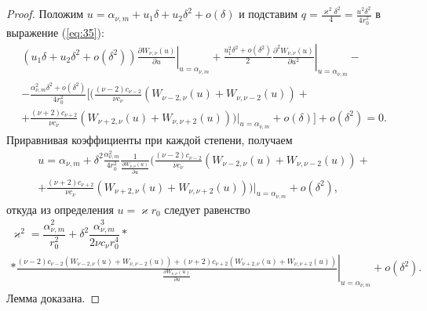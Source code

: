 \begin{proof}
Положим $u = \alpha_{\nu, m} + u_1 \delta + u_2 \delta^2 + o(\delta)$ и подставим $q = \frac{\varkappa^2 \delta^2}{4} = \frac{u^2 \delta^2}{4 r_0^2}$ в выражение (\ref{eq:35}):
\begin{multline*}
    (u_1 \delta + u_2 \delta^2 + o(\delta^2)) 
\left.
\frac{\partial W_{\nu, \nu}(u)}{\partial u}
\right|_{u=\alpha_{\nu, m}} + 
\left.
\frac{u_1^2\delta^2 + o(\delta^2)}{2}
\frac{\partial^2 W_{\nu, \nu}(u)}{\partial u^2}
\right|_{u=\alpha_{\nu, m}} - \\
-	\frac{\alpha_{\nu, m}^2 \delta^2 + o(\delta^2)}{4r_0^2}
\bigg[
\bigg(  \frac{(\nu-2) c_{\nu-2}}{\nu c_\nu} 
	\left(
	W_{\nu-2, \nu}(u) + W_{\nu, \nu-2}(u)
	\right)+ \\
	    + \frac{(\nu+2) c_{\nu+2}}{\nu c_\nu} 
	\left(
	W_{\nu+2, \nu}(u) + W_{\nu, \nu+2}(u)
	\right)
\left.
\bigg)
\right|_{u=\alpha_{\nu, m}}
+o(\delta)
\bigg]
 + o(\delta^2) = 0.
\end{multline*}
Приравнивая коэффициенты при каждой степени, получаем  
\begin{multline*}
    u = \alpha_{\nu, m} + \delta^2 \frac{\alpha_{\nu, m}^2}{4r_0^2} \frac{1}{\frac{\partial W_{\nu,\nu}(u)}{\partial u}}
\bigg(    
	\frac{(\nu-2) c_{\nu-2}}{\nu c_\nu} 
	\left(
	W_{\nu-2, \nu}(u) + W_{\nu, \nu-2}(u)
	\right)+ \\
	    + \frac{(\nu+2) c_{\nu+2}}{\nu c_\nu} 
	\left(
	W_{\nu+2, \nu}(u) + W_{\nu, \nu+2}(u)
	\right)
\left.
\bigg)
\right|_{u=\alpha_{\nu, m}} + o(\delta^2),
\end{multline*}
откуда из определения $u = \varkappa r_0$ следует равенство
{\small
\begin{multline*}
\varkappa^2 = \dfrac{\alpha_{\nu, m}^2}{r_0^2} + \delta^2 \dfrac{\alpha_{\nu, m}^3}{2 \nu c_\nu r_0^4} * \\ * \left. \frac{
	(\nu-2) c_{\nu-2}
	\left(
	W_{\nu-2, \nu}(u) + W_{\nu, \nu-2}(u)
	\right)+ 
    (\nu+2) c_{\nu+2}
	\left(
	W_{\nu+2, \nu}(u) + W_{\nu, \nu+2}(u)
	\right)
}{ \frac{\partial W_{\nu,\nu}(u)}{\partial u} }\right|_{u=\alpha_{\nu, m}} + o(\delta^2).
\end{multline*}
}
Лемма доказана.
\end{proof}

